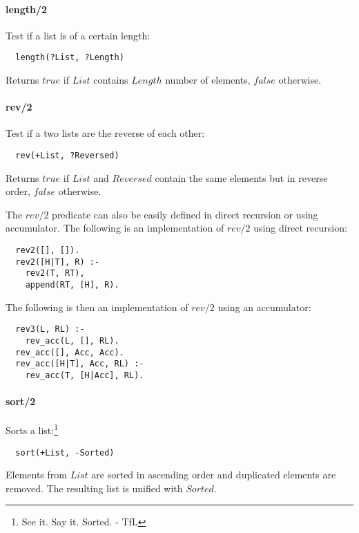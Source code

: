\documentclass{article}
\begin{document}
\begin{multicols}{2}
  \paragraph{length/2} Test if a list is of a certain length:
  
  \begin{lstlisting}
  length(?List, ?Length)
  \end{lstlisting} 
  
  Returns $true$ if $List$ contains $Length$ number of elements, $false$ otherwise.
  
  \paragraph{rev/2} Test if a two lists are the reverse of each other:
  
  \begin{lstlisting}
  rev(+List, ?Reversed)
  \end{lstlisting} 
  
  Returns $true$ if $List$ and $Reversed$ contain the same elements but in reverse order, $false$ otherwise.
  
  The $rev/2$ predicate can also be easily defined in direct recursion or using accumulator. The following is an implementation of $rev/2$ using direct recursion:
  
  \begin{lstlisting}
  rev2([], []).
  rev2([H|T], R) :-
    rev2(T, RT),
    append(RT, [H], R).
  \end{lstlisting}
  
  The following is then an implementation of $rev/2$ using an accumulator:
  
  \begin{lstlisting}
  rev3(L, RL) :-
    rev_acc(L, [], RL).
  rev_acc([], Acc, Acc).
  rev_acc([H|T], Acc, RL) :-
    rev_acc(T, [H|Acc], RL).
  \end{lstlisting}
  
  \paragraph{sort/2} Sorts a list:\footnote{See it. Say it. Sorted. - TfL}
  
  \begin{lstlisting}
  sort(+List, -Sorted)
  \end{lstlisting} 
  
  Elements from $List$ are sorted in ascending order and duplicated elements are removed. The resulting list is unified with $Sorted$.
  

\end{multicols}
\end{document}
